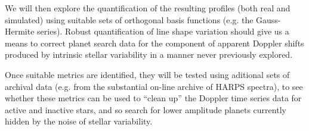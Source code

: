 \documentclass[a4paper]{article}
\begin{document}
We will then explore the quantification of the resulting profiles (both real and simulated) using suitable sets of orthogonal basis functions (e.g. the Gauss-Hermite series). Robust quantification of line shape variation should give us a means to correct planet search data for the component of apparent Doppler shifts produced by intrinsic stellar variability in a manner never previously explored. 

Once suitable metrics are identified, they will be tested using aditional sets of archival data (e.g. from the substantial on-line archive of HARPS spectra), to see whether these metrics can be used to ``clean up'' the Doppler time series data for active and inactive stars, and so search for lower amplitude planets currently hidden by the noise of stellar variability.





















\end{document}
